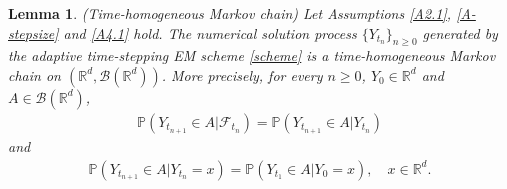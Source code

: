 \documentclass[preprint,12pt,compress]{elsarticle}
\newtheorem{lemma}[theorem]{Lemma}%
\begin{document}
\begin{lemma}  \label{markov}  (Time-homogeneous Markov chain) Let Assumptions \ref{A2.1}, \ref{A-stepsize} and \ref{A4.1} hold. The numerical solution process
${\{ {Y_{{t_n}}}\} _{n \ge 0}}$ generated by the adaptive time-stepping EM scheme \eqref{scheme} is a time-homogeneous Markov chain on $(\mathbb{R}^d, \mathcal{B}(\mathbb{R}^d))$. More precisely, for every $n \ge 0$, $Y_0 \in \mathbb{R}^d$ and $A \in \mathcal{B}(\mathbb{R}^d)$,
\begin{equation*}
\begin{split}
	\mathbb{P}\left( {{Y_{{t_{n + 1}}}} \in A|{\mathcal{F}_{{t_n}}}} \right) = \mathbb{P}\left( {{Y_{{t_{n + 1}}}} \in A|{Y_{{t_n}}}} \right)
\end{split}
\end{equation*}
and
\begin{equation*}
\begin{split}
	\mathbb{P}\left( {{Y_{{t_{n + 1}}}} \in A|{Y_{{t_n}}} = x } \right) = \mathbb{P}\left( {{Y_{{t_1}}} \in A|{Y_{{0}}} = x } \right), \quad x \in \mathbb{R}^d.
\end{split}
\end{equation*}
\end{lemma}
\end{document}
